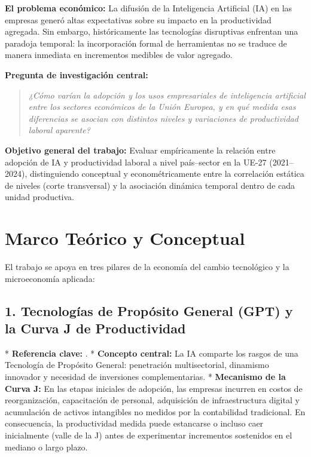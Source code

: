 \documentclass[12pt,a4paper]{article}
\begin{document}
\textbf{El problema económico:} La difusión de la Inteligencia Artificial (IA) en las empresas generó altas expectativas sobre su impacto en la productividad agregada. Sin embargo, históricamente las tecnologías disruptivas enfrentan una paradoja temporal: la incorporación formal de herramientas no se traduce de manera inmediata en incrementos medibles de valor agregado.

\textbf{Pregunta de investigación central:}
\begin{quote}
\textit{¿Cómo varían la adopción y los usos empresariales de inteligencia artificial entre los sectores económicos de la Unión Europea, y en qué medida esas diferencias se asocian con distintos niveles y variaciones de productividad laboral aparente?}
\end{quote}

\textbf{Objetivo general del trabajo:} Evaluar empíricamente la relación entre adopción de IA y productividad laboral a nivel país--sector en la UE-27 (2021--2024), distinguiendo conceptual y econométricamente entre la correlación estática de niveles (corte transversal) y la asociación dinámica temporal dentro de cada unidad productiva.

\section{Marco Teórico y Conceptual}

El trabajo se apoya en tres pilares de la economía del cambio tecnológico y la microeconomía aplicada:

\subsection{1. Tecnologías de Propósito General (GPT) y la Curva J de Productividad}
* \textbf{Referencia clave:} \citet{brynjolfsson2021productivity}.
* \textbf{Concepto central:} La IA comparte los rasgos de una Tecnología de Propósito General: penetración multisectorial, dinamismo innovador y necesidad de inversiones complementarias.
* \textbf{Mecanismo de la Curva J:} En las etapas iniciales de adopción, las empresas incurren en costos de reorganización, capacitación de personal, adquisición de infraestructura digital y acumulación de activos intangibles no medidos por la contabilidad tradicional. En consecuencia, la productividad medida puede estancarse o incluso caer inicialmente (valle de la J) antes de experimentar incrementos sostenidos en el mediano o largo plazo.
\end{document}

